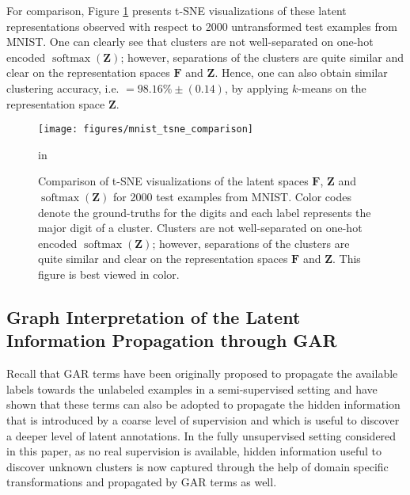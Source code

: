 \documentclass{article} \usepackage{iclr2018_conference,times}
\DeclareMathOperator{\softmax}{softmax}
\begin{document}
For comparison, Figure \ref{fig:pseudo_img_tsne_comparison} presents t-SNE visualizations of these latent representations observed with respect to 2000 untransformed test examples from MNIST. One can clearly see that clusters are not well-separated on one-hot encoded $\softmax(\boldsymbol{Z})$; however, separations of the clusters are quite similar and clear on the representation spaces $\boldsymbol{F}$ and $\boldsymbol{Z}$. Hence, one can also obtain similar clustering accuracy, i.e. $=98.16\%\pm(0.14)$, by applying $k$-means on the representation space $\boldsymbol{Z}$.
\begin{figure}[h]
	\begin{center}
		\centerline{\texttt{[image: figures/mnist\_tsne\_comparison]}}
		\caption{Comparison of t-SNE visualizations of the latent spaces $\boldsymbol{F}$, $\boldsymbol{Z}$ and $\softmax(\boldsymbol{Z})$ for 2000 test examples from MNIST. Color codes denote the ground-truths for the digits and each label represents the major digit of a cluster. Clusters are not well-separated on one-hot encoded $\softmax(\boldsymbol{Z})$; however, separations of the clusters are quite similar and clear on the representation spaces $\boldsymbol{F}$ and $\boldsymbol{Z}$. This figure is best viewed in color.}
		\label{fig:pseudo_img_tsne_comparison}
	\end{center}
	 in
\end{figure}


\subsection{Graph Interpretation of the Latent Information Propagation through GAR}

Recall that GAR terms have been originally proposed to propagate the available labels towards the unlabeled examples in a semi-supervised setting and \citet{KilincU17ACOL} have shown that these terms can also be adopted to propagate the hidden information that is introduced by a coarse level of supervision and which is useful to discover a deeper level of latent annotations. In the fully unsupervised setting considered in this paper, as no real supervision is available, hidden information useful to discover unknown clusters is now captured through the help of domain specific transformations and propagated by GAR terms as well. 
\end{document}
